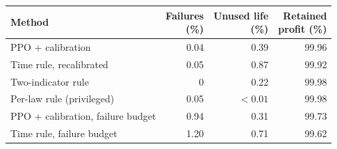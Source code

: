 {\footnotesize\setlength{\tabcolsep}{3pt}\renewcommand{\arraystretch}{1.08}%
\begin{tabular}{@{}lrrr@{}}
\toprule
Method & \shortstack{Failures\\(\%)} & \shortstack{Unused life\\(\%)} & \shortstack{Retained\\profit (\%)}\\
\midrule
PPO + calibration & 0.04 & 0.39 & 99.96\\
Time rule, recalibrated & 0.05 & 0.87 & 99.92\\
Two-indicator rule & 0 & 0.22 & 99.98\\
\midrule
Per-law rule (privileged) & 0.05 & $<0.01$ & 99.98\\
PPO + calibration, failure budget & 0.94 & 0.31 & 99.73\\
Time rule, failure budget & 1.20 & 0.71 & 99.62\\
\bottomrule
\end{tabular}}
